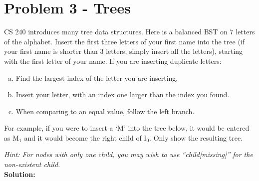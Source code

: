\documentclass[12pt]{article}
\begin{document}
\section*{Problem 3 - Trees}
CS 240 introduces many tree data structures. Here is a balanced BST on 7 letters of the 
alphabet. Insert the first three letters of your first name into the tree (if your first 
name is shorter than 3 letters, simply insert all the letters), starting 
with the first letter of your name. If you are inserting duplicate
letters:

\begin{enumerate}[a)]
	\item Find the largest index of the letter you are inserting. 
	\item Insert your letter, with an index one larger than the index you found.
	\item When comparing to an equal value, follow the left branch.

\end{enumerate}

For example, if you were to insert a `M' into the tree below, it would be entered as M$_1$ and it would become the right child of I$_0$. Only show the resulting tree.

\begin{center}\end{center}

{\it Hint: For nodes with only one child, you may wish to use ``child[missing]'' for the non-existent child.} \\

{\bf Solution:}

\begin{center}\end{center}
\end{document}
